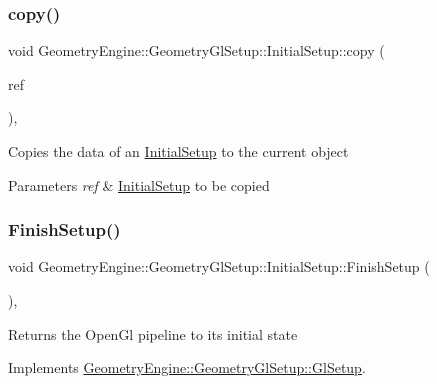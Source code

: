 \subsubsection{\texorpdfstring{copy()}{copy()}}
{\footnotesize\ttfamily void Geometry\+Engine\+::\+Geometry\+Gl\+Setup\+::\+Initial\+Setup\+::copy (\begin{DoxyParamCaption}\item[{const \mbox{\hyperlink{class_geometry_engine_1_1_geometry_gl_setup_1_1_initial_setup}{Initial\+Setup}} \&}]{ref }\end{DoxyParamCaption})\hspace{0.3cm}{\ttfamily [protected]}, {\ttfamily [virtual]}}

Copies the data of an \mbox{\hyperlink{class_geometry_engine_1_1_geometry_gl_setup_1_1_initial_setup}{Initial\+Setup}} to the current object 
\begin{DoxyParams}{Parameters}
{\em ref} & \mbox{\hyperlink{class_geometry_engine_1_1_geometry_gl_setup_1_1_initial_setup}{Initial\+Setup}} to be copied \\
\hline
\end{DoxyParams}
\mbox{\label{class_geometry_engine_1_1_geometry_gl_setup_1_1_initial_setup_a4ba4e34bcc09a800ab98dbe3181f1263}} 
\subsubsection{\texorpdfstring{FinishSetup()}{FinishSetup()}}
{\footnotesize\ttfamily void Geometry\+Engine\+::\+Geometry\+Gl\+Setup\+::\+Initial\+Setup\+::\+Finish\+Setup (\begin{DoxyParamCaption}{ }\end{DoxyParamCaption})\hspace{0.3cm}{\ttfamily [override]}, {\ttfamily [virtual]}}

\begin{DoxyReturn}{Returns}
the Open\+Gl pipeline to its initial state 
\end{DoxyReturn}


Implements \mbox{\hyperlink{class_geometry_engine_1_1_geometry_gl_setup_1_1_gl_setup_a6233d780b8ba17d9fd26f2aef0df26aa}{Geometry\+Engine\+::\+Geometry\+Gl\+Setup\+::\+Gl\+Setup}}.

